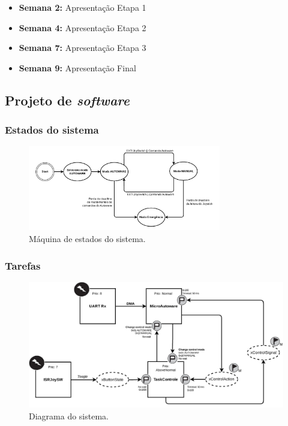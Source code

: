 \begin{itemize}
	\small
	\item \textbf{Semana 2:} Apresentação Etapa 1
	\item \textbf{Semana 4:} Apresentação Etapa 2
	\item \textbf{Semana 7:} Apresentação Etapa 3
	\item \textbf{Semana 9:} Apresentação Final
\end{itemize}


\subsection{Projeto de \textit{software}}

\subsubsection*{Estados do sistema}

\begin{figure}[H]
	\centering
	\includegraphics[width = 0.75\textwidth]{img/maquinadeestados}
	\caption{Máquina de estados do sistema.}
	\label{fig:maquinadeestados}
\end{figure}

\subsubsection*{Tarefas}

\begin{figure}[H]
	\centering
	\includegraphics[width = \textwidth]{img/system_diagram}
	\caption{Diagrama do sistema.}
	\label{fig:systemdiagram}
\end{figure}

